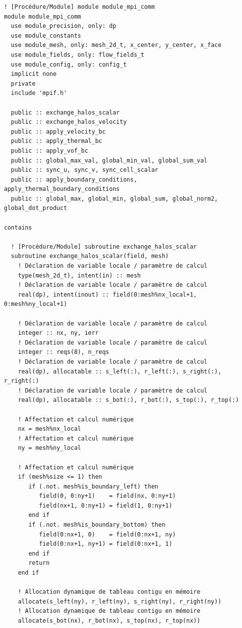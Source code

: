 \documentclass[10pt,a4paper,oneside]{book}
\begin{document}
\begin{lstlisting}[language={[95]Fortran}]
! [Procédure/Module] module module_mpi_comm
module module_mpi_comm
  use module_precision, only: dp
  use module_constants
  use module_mesh, only: mesh_2d_t, x_center, y_center, x_face
  use module_fields, only: flow_fields_t
  use module_config, only: config_t
  implicit none
  private
  include 'mpif.h'

  public :: exchange_halos_scalar
  public :: exchange_halos_velocity
  public :: apply_velocity_bc
  public :: apply_thermal_bc
  public :: apply_vof_bc
  public :: global_max_val, global_min_val, global_sum_val
  public :: sync_u, sync_v, sync_cell_scalar
  public :: apply_boundary_conditions, apply_thermal_boundary_conditions
  public :: global_max, global_min, global_sum, global_norm2, global_dot_product

contains

  ! [Procédure/Module] subroutine exchange_halos_scalar
  subroutine exchange_halos_scalar(field, mesh)
    ! Déclaration de variable locale / paramètre de calcul
    type(mesh_2d_t), intent(in) :: mesh
    ! Déclaration de variable locale / paramètre de calcul
    real(dp), intent(inout) :: field(0:mesh%nx_local+1, 0:mesh%ny_local+1)

    ! Déclaration de variable locale / paramètre de calcul
    integer :: nx, ny, ierr
    ! Déclaration de variable locale / paramètre de calcul
    integer :: reqs(8), n_reqs
    ! Déclaration de variable locale / paramètre de calcul
    real(dp), allocatable :: s_left(:), r_left(:), s_right(:), r_right(:)
    ! Déclaration de variable locale / paramètre de calcul
    real(dp), allocatable :: s_bot(:), r_bot(:), s_top(:), r_top(:)

    ! Affectation et calcul numérique
    nx = mesh%nx_local
    ! Affectation et calcul numérique
    ny = mesh%ny_local

    ! Affectation et calcul numérique
    if (mesh%size <= 1) then
       if (.not. mesh%is_boundary_left) then
          field(0, 0:ny+1)    = field(nx, 0:ny+1)
          field(nx+1, 0:ny+1) = field(1, 0:ny+1)
       end if
       if (.not. mesh%is_boundary_bottom) then
          field(0:nx+1, 0)    = field(0:nx+1, ny)
          field(0:nx+1, ny+1) = field(0:nx+1, 1)
       end if
       return
    end if

    ! Allocation dynamique de tableau contigu en mémoire
    allocate(s_left(ny), r_left(ny), s_right(ny), r_right(ny))
    ! Allocation dynamique de tableau contigu en mémoire
    allocate(s_bot(nx), r_bot(nx), s_top(nx), r_top(nx))


\end{lstlisting}
\end{document}
